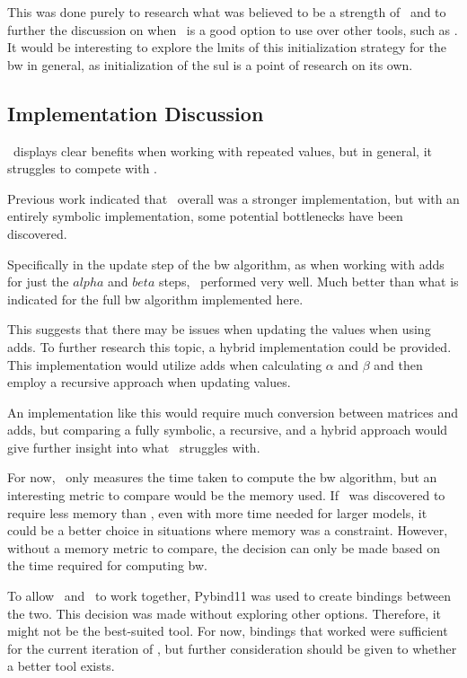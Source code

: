 This was done purely to research what was believed to be a strength of \Cupaal\ and to further the discussion on when \Cupaal\ is a good option to use over other tools, such as \Jajapy.
It would be interesting to explore the lmits of this initialization strategy for the \gls{bw} in general, as initialization of the \gls{sul} is a point of research on its own.


\subsection{Implementation Discussion}\label{subsec:implementation_discussion}
\Cupaal\ displays clear benefits when working with repeated values, but in general, it struggles to compete with \Jajapy.

Previous work indicated that \Cupaal\ overall was a stronger implementation, but with an entirely symbolic implementation, some potential bottlenecks have been discovered.

Specifically in the update step of the \gls{bw} algorithm, as when working with \glspl{add} for just the $alpha$ and $beta$ steps, \Cupaal\ performed very well.
Much better than what is indicated for the full \gls{bw} algorithm implemented here.

This suggests that there may be issues when updating the values when using \glspl{add}.
To further research this topic, a hybrid implementation could be provided.
This implementation would utilize \glspl{add} when calculating $\alpha$ and $\beta$ and then employ a recursive approach when updating values.

An implementation like this would require much conversion between matrices and \glspl{add}, but comparing a fully symbolic, a recursive, and a hybrid approach would give further insight into what \Cupaal\ struggles with.

For now, \Cupaal\ only measures the time taken to compute the \gls{bw} algorithm, but an interesting metric to compare would be the memory used.
If \Cupaal\ was discovered to require less memory than \Jajapy, even with more time needed for larger models, it could be a better choice in situations where memory was a constraint.
However, without a memory metric to compare, the decision can only be made based on the time required for computing \gls{bw}.

To allow \Cupaal\ and \Jajapy\ to work together, Pybind11 was used to create bindings between the two.
This decision was made without exploring other options. Therefore, it might not be the best-suited tool.
For now, bindings that worked were sufficient for the current iteration of \Cupaal, but further consideration should be given to whether a better tool exists.


